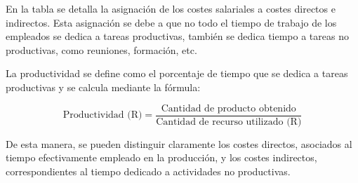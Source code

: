 
En la tabla  se detalla la asignación de los costes 
salariales a costes directos e indirectos. Esta asignación se debe a que no todo el tiempo de trabajo de los empleados se dedica a tareas productivas, 
también se dedica tiempo a tareas no productivas, como reuniones, formación, etc. 

La productividad se define como el porcentaje de tiempo que se dedica a tareas productivas y se calcula mediante la fórmula:

\[
\text{Productividad (R)} = \frac{\text{Cantidad de producto obtenido}}{\text{Cantidad de recurso utilizado (R)}}
\]

De esta manera, se pueden distinguir claramente los costes directos, asociados al tiempo efectivamente empleado en la producción, y los costes indirectos, correspondientes al tiempo dedicado a actividades no productivas.



